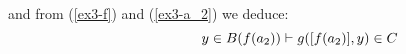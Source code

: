 \noindent
				and from (\ref{ex3-f}) and (\ref{ex3-a_2}) we deduce: \begin{equation}
				\hspace{2cm}y \in B(f(a_2)) \vdash g([f(a_2)], y) \in C\label{ex3-expr2}
				\end{equation}
			